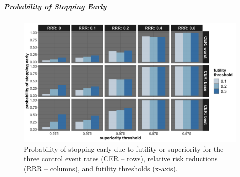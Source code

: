 \documentclass[]{article}
\let\oldsubparagraph\subparagraph
\renewcommand{\subparagraph}[1]{\oldsubparagraph{#1}\mbox{}}
\begin{document}
\clearpage

\hypertarget{probability-of-stopping-early-2}{%
\subparagraph{Probability of Stopping
Early}\label{probability-of-stopping-early-2}}

\begin{figure}
  \caption{Probability of stopping early due to futility or superiority for the three control event rates (CER – rows), relative risk reductions (RRR – columns), and futility thresholds (x-axis).}
  \includegraphics{../p1_plots/batch_size_nb_3000/prob_stop_early_p1.png}
\end{figure}
\end{document}
